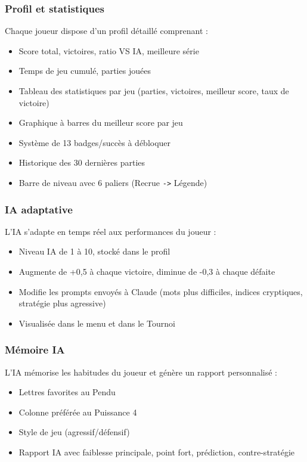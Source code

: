 \documentclass[a4paper, 12pt, twoside]{article}
\begin{document}
\subsubsection{Profil et statistiques}

Chaque joueur dispose d'un profil détaillé comprenant :
\begin{itemize}
  \item Score total, victoires, ratio VS IA, meilleure série
  \item Temps de jeu cumulé, parties jouées
  \item Tableau des statistiques par jeu (parties, victoires, meilleur score, taux de victoire)
  \item Graphique à barres du meilleur score par jeu
  \item Système de 13 badges/succès à débloquer
  \item Historique des 30 dernières parties
  \item Barre de niveau avec 6 paliers (Recrue \texttt{->} Légende)
\end{itemize}

\subsubsection{IA adaptative}

L'IA s'adapte en temps réel aux performances du joueur :
\begin{itemize}
  \item Niveau IA de 1 à 10, stocké dans le profil
  \item Augmente de +0,5 à chaque victoire, diminue de -0,3 à chaque défaite
  \item Modifie les prompts envoyés à Claude (mots plus difficiles, indices cryptiques, stratégie plus agressive)
  \item Visualisée dans le menu et dans le Tournoi
\end{itemize}

\subsubsection{Mémoire IA}

L'IA mémorise les habitudes du joueur et génère un rapport personnalisé :
\begin{itemize}
  \item Lettres favorites au Pendu
  \item Colonne préférée au Puissance 4
  \item Style de jeu (agressif/défensif)
  \item Rapport IA avec faiblesse principale, point fort, prédiction, contre-stratégie
\end{itemize}
\end{document}
